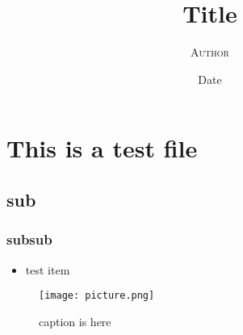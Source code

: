 \documentclass{article}
\begin{document}
\title{\textbf{Title}}
\author{\textsc{Author}}
\date{Date}
\maketitle

\section*{This is a test file}
\subsection*{sub}
\subsubsection*{subsub}
\begin{displayquote}
\begin{itemize}
\item test item
\end{itemize}
\end{displayquote}
\begin{figure}[H]
  \begin{center}
    \texttt{[image: picture.png]}
    \caption{caption is here}
    \label{label}
  \end{center}
\end{figure}
\end{document}
